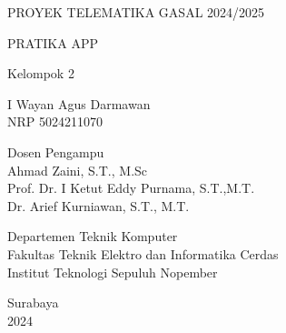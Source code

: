 \begin{large}
  PROYEK TELEMATIKA GASAL 2024/2025
\end{large}

\vspace{\fill}

\begin{spacing}{1.5}
  \begin{Large}
    PRATIKA APP
  \end{Large}
\end{spacing}

\vspace{\fill}

\begin{large}
 Kelompok 2\\
 \vspace{\fill}
\end{large}

\begin{large}
  I Wayan Agus Darmawan \\
  \textmd{NRP 5024211070}
\end{large}


\vspace{\fill}

\begin{large}
  \textmd{Dosen Pengampu} \\
  Ahmad Zaini, S.T., M.Sc \\
  Prof. Dr. I Ketut Eddy Purnama, S.T.,M.T. \\
  Dr. Arief Kurniawan, S.T., M.T.\\
\end{large}

\vspace{\fill}


\mdseries

Departemen Teknik Komputer \\
Fakultas Teknik Elektro dan Informatika Cerdas \\
Institut Teknologi Sepuluh Nopember

Surabaya \\
2024
